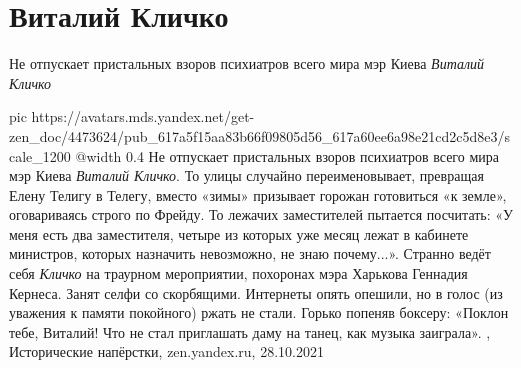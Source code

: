  
 
 
 
 
\chapter{Виталий Кличко}
\label{sec:people.klichko_vitalij}

\begin{cmtfront}
Не отпускает пристальных взоров психиатров всего мира мэр Киева \emph{Виталий Кличко}	
\end{cmtfront}

\ifcmt
  pic https://avatars.mds.yandex.net/get-zen_doc/4473624/pub_617a5f15aa83b66f09805d56_617a60ee6a98e21cd2c5d8e3/scale_1200
  @width 0.4
\fi
Не отпускает пристальных взоров психиатров всего мира мэр Киева \emph{Виталий
Кличко}.  То улицы случайно переименовывает, превращая Елену Телигу в Телегу,
вместо «зимы» призывает горожан готовиться «к земле», оговариваясь строго по
Фрейду.  То лежачих заместителей пытается посчитать: «У меня есть два
заместителя, четыре из которых уже месяц лежат в кабинете министров, которых
назначить невозможно, не знаю почему...».  Странно ведёт себя \emph{Кличко} на
траурном мероприятии, похоронах мэра Харькова Геннадия Кернеса. Занят селфи со
скорбящими. Интернеты опять опешили, но в голос (из уважения к памяти
покойного) ржать не стали. Горько попеняв боксеру: «Поклон тебе, Виталий! Что
не стал приглашать даму на танец, как музыка заиграла».
, 
Исторические напёрстки, zen.yandex.ru, 28.10.2021
